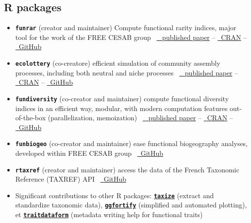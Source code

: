 \documentclass[10pt,a4paper,]{article}
\begin{document}
\hypertarget{r-packages}{%
\subsection{R packages}\label{r-packages}}

\begin{itemize}
\item
  \textbf{\texttt{funrar}} (creator and maintainer) \hfill\break Compute
  functional rarity indices, major tool for the work of the FREE CESAB
  group \hfill\break ~\href{https://doi.org/10.1111/ddi.12629}{\faFile*~
  published paper} --
  \href{https://cran.r-project.org/package=funrar}{\faRProject~CRAN} --
  \href{https://github.com/Rekyt/funrar}{\faGithub~GitHub}
\item
  \textbf{\texttt{ecolottery}} (co-creatore) \hfill\break efficient
  simulation of community assembly processes, including both neutral and
  niche processes
  \hfill\break ~\href{https://doi.org/10.1111/2041-210X.12918}{\faFile*~
  published paper} --
  \href{https://cran.r-project.org/package=ecolottery}{\faRProject~CRAN}
  -- \href{https://github.com/frmunoz/ecolottery}{\faGithub~GitHub}
\item
  \textbf{\texttt{fundiversity}} (co-creator and maintainer)
  \hfill\break compute functional diversity indices in an efficient way,
  modular, with modern computation features out-of-the-box
  (parallelization, memoization)
  \hfill\break ~\href{https://doi.org/10.1111/ecog.06585}{\faFile*~
  published paper} --
  \href{https://cran.r-project.org/package=fundiversity}{\faRProject~CRAN}
  -- \href{https://github.com/bisaloo/fundiversity}{\faGithub~GitHub}
\item
  \textbf{\texttt{funbiogeo}} (co-creator and maintainer)
  \hfill\break ease functional biogeography analyses, developed within
  FREE CESAB group
  \hfill\break ~\href{https://github.com/FRBCesab/funbiogeo}{\faGithub~GitHub}
\item
  \textbf{\texttt{rtaxref}} (creator and maintainer) \hfill\break access
  the data of the French Taxonomic Reference (TAXREF) API
  \hfill\break ~\href{https://github.com/Rekyt/rtaxref}{\faGithub~GitHub}
\item
  Significant contributions to other R packages:
  \href{https://cran.r-project.org/package=taxize}{\textbf{\texttt{taxize}}}
  (extract and standardize taxonomic data),
  \href{https://cran.r-project.org/package=ggfortify}{\textbf{\texttt{ggfortify}}}
  (simplified and automated plotting), et
  \href{https://cran.r-project.org/package=traitdataform}{\textbf{\texttt{traitdataform}}}
  (metadata writing help for functional traits)
\end{itemize}
\end{document}
